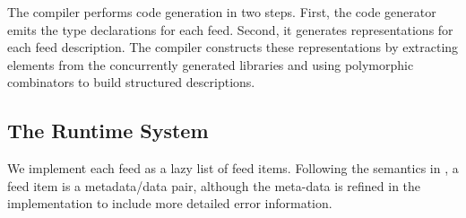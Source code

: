 The  compiler performs code generation in two steps.
First, the code generator emits the
type declarations for each feed.  
Second, it generates representations for each feed description.  
The compiler constructs these representations
by extracting elements from the concurrently
generated \padsml{} libraries
and using polymorphic combinators to build structured 
descriptions.  

\subsection{The Runtime System}
We implement each \padsd{} feed as a lazy list of feed items. 
Following the semantics in , 
a feed item is a metadata/data pair, 
although the meta-data is refined in the implementation to include
more detailed error information.



